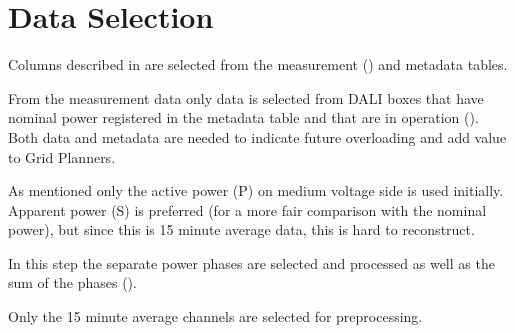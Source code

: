 \documentclass[letterpaper,10pt,english]{sphinxmanual}
\begin{document}
\section{Data Selection}
\label{\detokenize{data_preparation:data-selection}}
Columns described in  are selected from the measurement () and metadata tables.

From the measurement data only data is selected from DALI boxes that have nominal power registered in the metadata table and that are in operation ({\hyperref[\detokenize{autoapi/src/utils/snowflake/index:src.utils.snowflake.read_meta}]{}}). Both data and metadata are needed to indicate future overloading and add value to Grid Planners.

As mentioned only the active power (P) on medium voltage side is used initially. Apparent power (S) is preferred (for a more fair comparison with the nominal power), but since this is 15 minute average data, this is hard to reconstruct.

In this step the separate power phases are selected and processed as well as the sum of the phases ({\hyperref[\detokenize{autoapi/src/utils/snowflake/index:src.utils.snowflake.make_week_extremes_query}]{}}).

Only the 15 minute average channels are selected for preprocessing.
\end{document}
